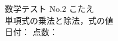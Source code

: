 \documentclass[a4paper,14pt]{article}  %
\begin{document}
\begin{tcolorbox}[
  colback=myblue!5,     %
  colframe=myblue,      %
  boxrule=1pt,
  arc=3mm,
  width=\textwidth
]

\begin{center}                                               %
{\Large  \textcolor{myblue}{数学テスト No.2 こたえ}}\\[0.4em]         %
{  単項式の乗法と除法，式の値}\\[0.8em]               %
\textcolor{myred}{日付：\underline{\hspace{3cm}} \hfill 点数：\underline{\hspace{2cm}}}
\end{center}
\end{tcolorbox}

\vspace{1em}  %

\end{document}
